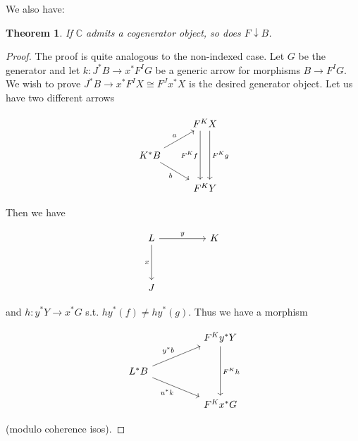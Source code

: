\documentclass[10pt, oneside]{article}
\newtheorem{theorem}{Theorem}[section]
\newtheorem{lemma}[theorem]{Lemma}
\begin{document}
We also have:

\begin{comment}
\begin{lemma}
    Suppose $\mathbb{C}$ is $\mathcal{S}$-cocomplete and locally small. Then $G \in \mathcal{C}^I$ is a generator
\end{lemma}
\end{comment}

\begin{theorem}
    If $\mathbb{C}$ admits a cogenerator object, so does $F \downarrow B$.
\end{theorem}
\begin{proof}
    The proof is quite analogous to the non-indexed case. Let $G$ be the generator and let $k: J^\ast B \to x^\ast F^I G$ be a generic arrow for morphisms $B \to F^I G$. We wish to prove $J^\ast B \to x^\ast F^I X \cong F^J x^\ast X$ is the desired generator object. Let us have two different arrows

    \[\begin{tikzcd}[ampersand replacement=\&]
	\& {F^K X} \\
	{K^\ast B} \\
	\& {F^K Y}
	\arrow["a", from=2-1, to=1-2]
	\arrow["b"', from=2-1, to=3-2]
	\arrow["{F^K f}"', shift right=2, from=1-2, to=3-2]
	\arrow["{F^K g}", shift left=2, from=1-2, to=3-2]
\end{tikzcd}\]

Then we have

\[\begin{tikzcd}[ampersand replacement=\&]
	L \&\& K \\
	\\
	J
	\arrow["x"', from=1-1, to=3-1]
	\arrow["y", from=1-1, to=1-3]
\end{tikzcd}\]

and $h: y^\ast Y \to x^\ast G$ s.t. $h y^\ast (f) \neq h y^\ast (g)$. Thus we have a morphism

\[\begin{tikzcd}[ampersand replacement=\&]
	\&\& {F^K y^\ast Y} \\
	{L^\ast B} \\
	\&\& {F^K x^\ast G}
	\arrow["{y^\ast b}", from=2-1, to=1-3]
	\arrow["{F^K h}", from=1-3, to=3-3]
	\arrow["{u^\ast k}"', from=2-1, to=3-3]
\end{tikzcd}\]

\noindent (modulo coherence isos).

\end{proof}
\end{document}
